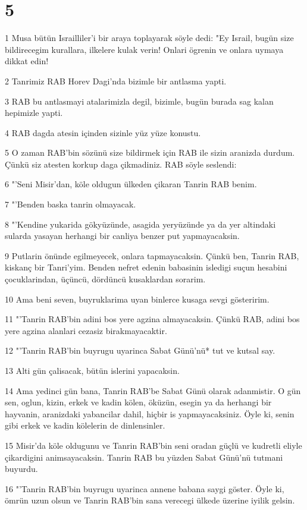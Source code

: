 \chapter{5}

\par 1 Musa bütün Israilliler'i bir araya toplayarak söyle dedi: "Ey Israil, bugün size bildirecegim kurallara, ilkelere kulak verin! Onlari ögrenin ve onlara uymaya dikkat edin!
\par 2 Tanrimiz RAB Horev Dagi'nda bizimle bir antlasma yapti.
\par 3 RAB bu antlasmayi atalarimizla degil, bizimle, bugün burada sag kalan hepimizle yapti.
\par 4 RAB dagda atesin içinden sizinle yüz yüze konustu.
\par 5 O zaman RAB'bin sözünü size bildirmek için RAB ile sizin aranizda durdum. Çünkü siz atesten korkup daga çikmadiniz. RAB söyle seslendi:
\par 6 "'Seni Misir'dan, köle oldugun ülkeden çikaran Tanrin RAB benim.
\par 7 "'Benden baska tanrin olmayacak.
\par 8 "'Kendine yukarida gökyüzünde, asagida yeryüzünde ya da yer altindaki sularda yasayan herhangi bir canliya benzer put yapmayacaksin.
\par 9 Putlarin önünde egilmeyecek, onlara tapmayacaksin. Çünkü ben, Tanrin RAB, kiskanç bir Tanri'yim. Benden nefret edenin babasinin isledigi suçun hesabini çocuklarindan, üçüncü, dördüncü kusaklardan sorarim.
\par 10 Ama beni seven, buyruklarima uyan binlerce kusaga sevgi gösteririm.
\par 11 "'Tanrin RAB'bin adini bos yere agzina almayacaksin. Çünkü RAB, adini bos yere agzina alanlari cezasiz birakmayacaktir.
\par 12 "'Tanrin RAB'bin buyrugu uyarinca Sabat Günü'nü* tut ve kutsal say.
\par 13 Alti gün çalisacak, bütün islerini yapacaksin.
\par 14 Ama yedinci gün bana, Tanrin RAB'be Sabat Günü olarak adanmistir. O gün sen, oglun, kizin, erkek ve kadin kölen, öküzün, esegin ya da herhangi bir hayvanin, aranizdaki yabancilar dahil, hiçbir is yapmayacaksiniz. Öyle ki, senin gibi erkek ve kadin kölelerin de dinlensinler.
\par 15 Misir'da köle oldugunu ve Tanrin RAB'bin seni oradan güçlü ve kudretli eliyle çikardigini animsayacaksin. Tanrin RAB bu yüzden Sabat Günü'nü tutmani buyurdu.
\par 16 "'Tanrin RAB'bin buyrugu uyarinca annene babana saygi göster. Öyle ki, ömrün uzun olsun ve Tanrin RAB'bin sana verecegi ülkede üzerine iyilik gelsin.
